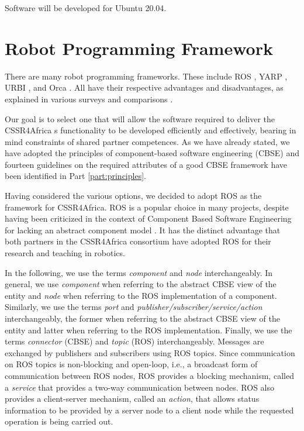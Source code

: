\documentclass{CSSRforAfrica}
\begin{document}
Software will be developed for Ubuntu 20.04.


\section{Robot Programming Framework}
\label{section:framework}

There are many robot programming frameworks. These include ROS \cite{Quigleyetal09}, YARP \cite{MettaFitzpatrickNatale06}, URBI \cite{Baillie05}, and Orca \cite{Soetens06,Brooksetal07}.  All have their respective advantages and disadvantages, as explained in various surveys and comparisons \cite{MakarenkoBrooksKaupp07,Barakovaetal13}.  

Our goal is to select one that will allow the software required to deliver the CSSR4Africa s functionality to be developed efficiently and effectively, bearing in mind constraints of shared partner competences.  As we have already stated, we have adopted the principles of component-based software engineering (CBSE) and fourteen guidelines on the required attributes of a good CBSE framework have been  identified in Part \ref{part:principles}.  

Having considered the  various options, we decided to adopt ROS \cite{ROS} as the framework for CSSR4Africa.  ROS is a popular choice in many projects, despite having been criticized in the context of Component Based Software Engineering for lacking an abstract component model \cite{SchlegelSteckLotz2011}. It has the distinct advantage that both partners in the CSSR4Africa consortium have adopted ROS for their research and teaching in robotics.

In the following, we use the terms {\em component} and {\em node} interchangeably.  In general, we use {\em component} when referring to the  abstract CBSE view of the entity and {\em node} when referring to the ROS implementation of a component. Similarly,  we use the terms {\em port} and {\em  publisher/subscriber/service/action} interchangeably,  the former when referring to the  abstract CBSE view of the entity and latter when referring to the ROS implementation. 
Finally,  we use the terms {\em connector} (CBSE) and {\em topic} (ROS) interchangeably.  Messages are exchanged by publishers and subscribers using ROS topics.  Since communication on ROS topics is non-blocking and open-loop, i.e., a broadcast form of communication between ROS nodes, ROS provides a blocking mechanism, called a {\em service} that provides a two-way communication between nodes. ROS also provides a client-server mechanism, called an {\em action}, that allows status information to be provided by a server node to a client node while the requested operation is being carried out.
\end{document}
